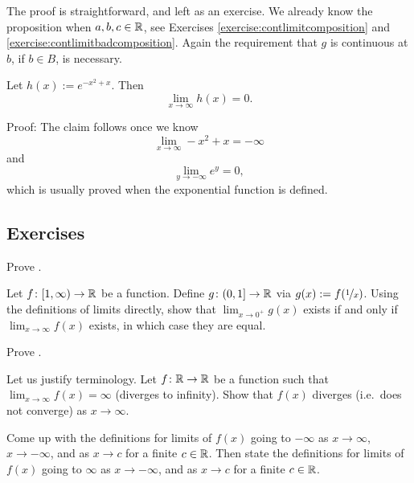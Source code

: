 The proof is straightforward, and left as an exercise.  We already
know the proposition when $a, b, c \in {\mathbb{R}}$, see Exercises
\ref{exercise:contlimitcomposition} and
\ref{exercise:contlimitbadcomposition}.  Again the requirement that $g$ is
continuous at $b$, if $b \in B$, is necessary.

\begin{example}
Let $h(x) := e^{-x^2+x}$.  Then
\begin{equation*}
\lim_{x\to \infty} h(x) = 0 .
\end{equation*}

Proof:
The claim follows once we know
\begin{equation*}
\lim_{x\to \infty} -x^2+x = -\infty
\end{equation*}
and
\begin{equation*}
\lim_{y\to -\infty} e^y = 0 ,
\end{equation*}
which is usually proved when the exponential function is defined.
\end{example}

\subsection{Exercises}

\begin{exercise}
Prove .
\end{exercise}

\begin{exercise}
Let $f \colon [1,\infty) \to {\mathbb{R}}$ be a function.  Define
$g \colon (0,1] \to {\mathbb{R}}$ via $g(x) := f(\nicefrac{1}{x})$.
Using the definitions of limits directly,
show that $\lim_{x\to 0^+} g(x)$
exists if and only if $\lim_{x\to \infty} f(x)$ exists, in which
case they are equal.
\end{exercise}

\begin{exercise}
Prove .
\end{exercise}

\begin{exercise}
Let us justify terminology.
Let $f \colon {\mathbb{R}} \to {\mathbb{R}}$ be a function such that
$\lim_{x \to \infty} f(x) = \infty$ (diverges to infinity).
Show that $f(x)$ diverges (i.e.\ does not converge) as $x \to \infty$.
\end{exercise}

\begin{exercise}
Come up with the definitions for limits of $f(x)$ going to $-\infty$ as $x \to
\infty$, $x \to -\infty$, and as $x \to c$ for a finite $c \in {\mathbb{R}}$.
Then state the definitions for limits of $f(x)$ going to $\infty$ 
as $x \to -\infty$, and as $x \to c$ for a finite $c \in {\mathbb{R}}$.
\end{exercise}

